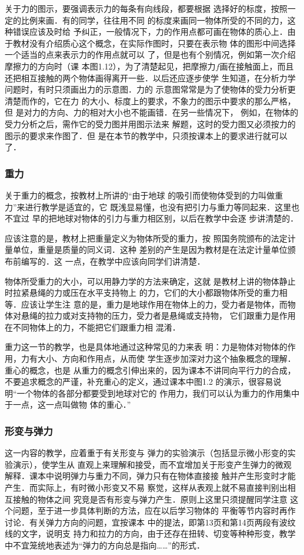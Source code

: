 关于力的图示，要强调表示力的每条有向线段，都要根据
选择好的标度，按照一定的比例来画．有的同学，往往用不同
的标度来画同一物体所受的不同的力，这种错误应该及时给
予纠正，一般情况下，力的作用点都可画在物体的质心上．由
于教材没有介绍质心这个概念，在实际作图时，只要在表示物
体的图形中间选择一个适当的点来表示力的作用点就可以
了，但是也有个别情况，例如第一次介绍摩擦力的方向时（课
本图1.12），为了清楚起见，把摩擦力$f$画在接触面上，而且
还把相互接触的两个物体画得离开一些．以后还应逐步使学
生知道，在分析力学问题时，有时只须画出力的示意图．力的
示意图常常是为了使物体的受力分析更清楚而作的，它在力
的大小、标度上的要求，不象力的图示中要求的那么严格，但
是对力的方向、力的相对大小也不能画错．在另一些情况下，
例如，在物体的受力分析之后，需作它的受力图并用图示法来
解题，这时的受力图又必须按力的图示的要求来作图了．但
是在本节的教学中，只须按课本上的要求进行就可以了．

\subsubsection{重力} 关于重力的概念，按教材上所讲的“由于地球
的吸引而使物体受到的力叫做重力”来进行教学是适宜的，它
既浅显易懂，也没有把引力与重力等同起来．这里也不宜过
早的把地球对物体的引力与重力相区别，以后在教学中会逐
步讲清楚的．

应该注意的是，教材上把重量定义为物体所受的重力，按
照国务院颁布的法定计量单位，重量是质量的同义词．这种
差别的产生是因为教材是在法定计量单位颁布前编写的．这
一点，在教学中应该向同学们讲清楚．

物体所受重力的大小，可以用静力学的方法来确定，这就
是教材上讲的物体静止时拉紧悬绳的力或压在水平支持物上
的力，它们的大小都跟物体所受的重力相等．应该让学生注
意的是，重力是地球作用在物体上的力，受力者是物体，而物
体对悬绳的拉力或对支持物的压力，受力者是悬绳或支持物，
它们跟重力是作用在不同物体上的力，不能把它们跟重力相
混淆．

重力这一节的教学，也是具体地通过这种常见的力来表
明：力是物体对物体的作用，力有大小、方向和作用点，从而使
学生逐步加深对力这个抽象概念的理解．重心的概念，也是
从重力的概念引伸出来的，因为课本不讲同向平行力的合成，
不要追求概念的严谨，补充重心的定义，通过课本中图1.2
的演示，很容易说明“一个物体的各部分都要受到地球对它的
作用力，我们可以认为重力的作用集中于一点，这一点叫做物
体的重心．”

\subsubsection{形变与弹力}
这一内容的教学，应着重于有关形变与
弹力的实验演示（包括显示微小形变的实验演示），使学生从
直观上来理解和接受，而不宜增加关于形变产生弹力的微观
解释．课本中说明弹力与重力不同，弹力只有在物体直接接
触并产生形变时才能产生．而实际上，有时微小形变又不易
察觉，这样从表观上就不易直接判别出相互接触的物体之间
究竞是否有形变与弹力产生．原则上这里只须提醒同学注意
这个问题，至于进一步具体判断的方法，应在以后学习物体的
平衡等节内容时再作讨论．有关弹力方向的问题，宜按课本
中的提法，即第13页和第14页两段有波纹线的文字，说明支
持力和拉力的方向，由于还存在扭转、切变等种种形变，教学
中不宜笼统地表述为“弹力的方向总是指向……”的形式．

